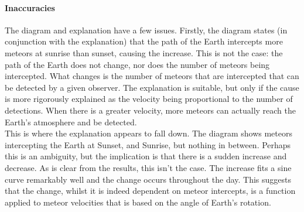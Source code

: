 \paragraph{Inaccuracies\\}
The diagram and explanation have a few issues. Firstly, the diagram states (in conjunction with the explanation) that the path of the Earth intercepts more meteors at sunrise than sunset, causing the increase. This is not the case: the path of the Earth does not change, nor does the number of meteors being intercepted. What changes is the number of meteors that are intercepted that can be detected by a given observer. The explanation is suitable, but only if the cause is more rigorously explained as the velocity being proportional to the number of detections. When there is a greater velocity, more meteors can actually reach the Earth's atmosphere and be detected. \\
This is where the explanation appears to fall down. The diagram shows meteors intercepting the Earth at Sunset, and Sunrise, but nothing in between. Perhaps this is an ambiguity, but the implication is that there is a sudden increase and decrease. As is clear from the results, this isn't the case. The increase fits a sine curve remarkably well and the change occurs throughout the day. This suggests that the change, whilst it is indeed dependent on meteor intercepts, is a function applied to meteor velocities that is based on the angle of Earth's rotation. \\

